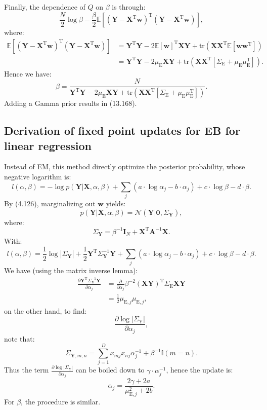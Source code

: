 \documentclass[UTF8]{ctexart}
\begin{document}
Finally, the dependence of $Q$ on $\beta$ is through:
$$\frac{N}{2}\log \beta-\frac{\beta}{2}\mathbb{E}\left[\left(\textbf{Y}-\textbf{X}^{\text{T}}\textbf{w} \right)^{\text{T}}\left(\textbf{Y}-\textbf{X}^{\text{T}}\textbf{w} \right) \right],$$
where:
$$
\begin{aligned}
\mathbb{E}\left[\left(\textbf{Y}-\textbf{X}^{\text{T}}\textbf{w} \right)^{\text{T}}\left(\textbf{Y}-\textbf{X}^{\text{T}}\textbf{w} \right) \right]&=\textbf{Y}^{\text{T}}\textbf{Y}-2\mathbb{E}[\textbf{w}]^{\text{T}}\textbf{X}\textbf{Y}+\text{tr}(\textbf{X}\textbf{X}^{\text{T}}\mathbb{E}[\textbf{w}\textbf{w}^{\text{T}}])\\
&=\textbf{Y}^{\text{T}}\textbf{Y}-2\mu_{\text{E}}\textbf{X}\textbf{Y}+\text{tr}(\textbf{X}\textbf{X}^{\text{T}}[\Sigma_{\text{E}}+\mu_{\text{E}}\mu_{\text{E}}^{\text{T}}]).
\end{aligned}
$$
Hence we have:
$$\beta=\frac{N}{\textbf{Y}^{\text{T}}\textbf{Y}-2\mu_{\text{E}}\textbf{X}\textbf{Y}+\text{tr}(\textbf{X}\textbf{X}^{\text{T}}[\Sigma_{\text{E}}+\mu_{\text{E}}\mu_{\text{E}}^{\text{T}}])}.$$
Adding a Gamma prior results in (13.168).

\subsection{Derivation of fixed point updates for EB for linear regression}
Instead of EM, this method directly optimize the posterior probability, whose negative logarithm is:
$$l(\alpha,\beta)=-\log p(\textbf{Y}|\textbf{X},\alpha,\beta)+\sum_{j}(a\cdot \log \alpha_{j}-b\cdot \alpha_{j})+c\cdot\log\beta-d\cdot\beta.$$
By (4.126), marginalizing out $\textbf{w}$ yields:
$$p(\textbf{Y}|\textbf{X},\alpha,\beta)=\mathcal{N}(\textbf{Y}|\textbf{0},\Sigma_{\textbf{Y}}),$$
where:
$$\Sigma_{\textbf{Y}}=\beta^{-1}\textbf{I}_{N}+\textbf{X}^{\text{T}}\textbf{A}^{-1}\textbf{X}.$$
With:
$$l(\alpha,\beta)=\frac{1}{2}\log |\Sigma_{\textbf{Y}}|+\frac{1}{2}\textbf{Y}^{\text{T}}\Sigma^{-1}_{\textbf{Y}}\textbf{Y}+\sum_{j}(a\cdot \log \alpha_{j}-b\cdot \alpha_{j})+c\cdot\log\beta-d\cdot\beta.$$
We have (using the matrix inverse lemma):
$$\begin{aligned}
\frac{\partial \textbf{Y}^{\text{T}}\Sigma^{-1}_{\textbf{Y}}\textbf{Y}}{\partial \alpha_{j}}&=\frac{\partial}{\partial \alpha_{j}}\beta^{-2}(\textbf{X}\textbf{Y})^{\text{T}}\Sigma_{\text{E}}\textbf{X}\textbf{Y}\\
&=\frac{1}{2}\mu_{\text{E},j}\mu_{\text{E},j},
\end{aligned}$$
on the other hand, to find:
$$\frac{\partial \log |\Sigma_{\text{Y}}|}{\partial \alpha_{j}},$$
note that:
$$\Sigma_{\textbf{Y},m,n}=\sum_{j=1}^{D}x_{mj}x_{nj}\alpha^{-1}_{j}+\beta^{-1}\mathbb{I}(m=n).$$
Thus the term $\frac{\partial \log |\Sigma_{\text{Y}}|}{\partial \alpha_{j}}$ can be boiled down to $\gamma\cdot \alpha^{-1}_{j}$, hence the update is:
$$\alpha_{j}=\frac{2\gamma+2a}{\mu_{\text{E},j}^{2}+2b}.$$
For $\beta$, the procedure is similar.
\end{document}
